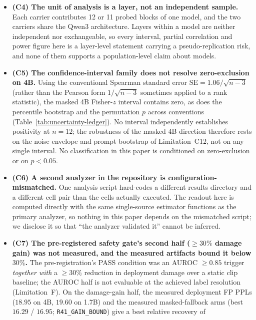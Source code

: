 \documentclass{article}
\newcommand{\bk}{\discretionary{}{}{}}
\begin{document}
\begin{itemize}
  \item \textbf{(C4) The unit of analysis is a layer, not an independent sample.} Each carrier
        contributes 12 or 11 probed blocks of one model, and the two carriers share the Qwen3
        architecture. Layers within a model are neither independent nor exchangeable, so every
        interval, partial correlation and power figure here is a layer-level statement carrying a
        pseudo-replication risk, and none of them supports a population-level claim about models.
  \item \textbf{(C5) The confidence-interval family does not resolve zero-exclusion on 4B.}
        Using the conventional Spearman standard error $\mathrm{SE}=1.06/\sqrt{n-3}$ (rather than
        the Pearson form $1/\sqrt{n-3}$ sometimes applied to a rank statistic), the masked 4B
        Fisher-$z$ interval contains zero, as does the percentile bootstrap and the permutation
        $p$ across conventions (Table~\ref{tab:uncertainty-ledger}). No interval independently
        establishes positivity at $n{=}12$; the robustness of the masked 4B direction therefore
        rests on the noise envelope and prompt bootstrap of Limitation~C12, not on any single
        interval. No classification in this paper is conditioned on zero-exclusion or on
        $p<0.05$.
  \item \textbf{(C6) A second analyzer in the repository is configuration-mismatched.} One
        analysis script hard-codes a different results directory and a different cell pair than
        the cells actually executed. The readout here is computed directly with the same
        single-source estimator functions as the primary analyzer, so nothing in this paper
        depends on the mismatched script; we disclose it so that ``the analyzer validated it''
        cannot be inferred.
  \item \textbf{(C7) The pre-registered safety gate's second half ($\ge 30\%$ damage gain) was not
        measured, and the measured artifacts bound it below $30\%$.} The pre-registration's PASS
        condition was an AUROC $\ge 0.85$ trigger \emph{together with} a ${\ge}30\%$ reduction in
        deployment damage over a static clip baseline; the AUROC half is not evaluable at the
        achieved label resolution (Limitation~F). On the damage-gain half, the measured deployment
        FP PPLs ($18.95$ on 4B, $19.60$ on 1.7B) and the measured masked-fallback arms (best
        $16.29$ / $16.95$; \texttt{R41\bk\_GAIN\bk\_BOUND}) give a best relative recovery of

\end{itemize}
\end{document}
